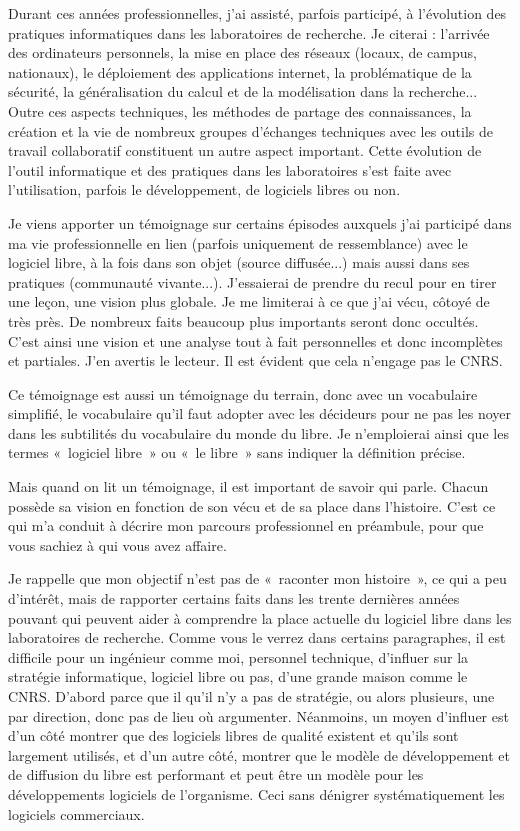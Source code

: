 \documentclass{FramateX}
\begin{document}
\begin{refsection}
Durant ces années professionnelles, j'ai assisté, parfois participé, à
l'évolution des pratiques informatiques dans les laboratoires de
recherche. Je citerai : l'arrivée des ordinateurs personnels, la mise
en place des réseaux (locaux, de campus, nationaux), le déploiement des
applications internet, la problématique de la sécurité, la
généralisation du calcul et de la modélisation dans la recherche...
Outre ces aspects techniques, les méthodes de partage des
connaissances, la création et la vie de nombreux groupes d'échanges
techniques avec les outils de travail collaboratif constituent un autre
aspect important. Cette évolution de l'outil informatique et des
pratiques dans les laboratoires s'est faite avec l'utilisation, parfois
le développement, de logiciels libres ou non.

Je viens apporter un témoignage sur certains épisodes auxquels j'ai
participé dans ma vie professionnelle en lien (parfois uniquement de
ressemblance) avec le logiciel libre, à la fois dans son objet (source
diffusée...) mais aussi dans ses pratiques (communauté vivante...).
J'essaierai de prendre du recul pour en tirer une leçon, une vision
plus globale. Je me limiterai à ce que j'ai vécu, côtoyé de très près.
De nombreux faits beaucoup plus importants seront donc occultés. C'est
ainsi une vision et une analyse tout à fait personnelles et donc
incomplètes et partiales. J'en avertis le lecteur. Il est évident que
cela n'engage pas le CNRS.

Ce témoignage est aussi un témoignage du terrain, donc avec un
vocabulaire simplifié, le vocabulaire qu'il faut adopter avec les
décideurs pour ne pas les noyer dans les subtilités du vocabulaire du
monde du libre. Je n'emploierai ainsi que les termes «~logiciel libre~»
ou «~le libre~» sans indiquer la définition précise.

Mais quand on lit un témoignage, il est important de savoir qui parle.
Chacun possède sa vision en fonction de son vécu et de sa place dans
l'histoire. C'est ce qui m'a conduit à décrire mon parcours
professionnel en préambule, pour que vous sachiez à qui vous avez
affaire.

Je rappelle que mon objectif n'est pas de «~raconter mon histoire~», ce
qui a peu d'intérêt, mais de rapporter certains faits dans les trente
dernières années pouvant qui peuvent aider à comprendre la place
actuelle du logiciel libre dans les laboratoires de recherche. Comme
vous le verrez dans certains paragraphes, il est difficile pour un
ingénieur comme moi, personnel technique, d'influer sur la stratégie
informatique, logiciel libre ou pas, d'une grande maison comme le CNRS.
D'abord parce que il qu'il n'y a pas de stratégie, ou alors plusieurs,
une par direction, donc pas de lieu où argumenter. Néanmoins, un moyen
d'influer est d'un côté montrer que des logiciels libres de qualité
existent et qu'ils sont largement utilisés, et d'un autre côté, montrer
que le modèle de développement et de diffusion du libre est performant
et peut être un modèle pour les développements logiciels de
l'organisme. Ceci sans dénigrer systématiquement les logiciels
commerciaux.


\end{refsection}
\end{document}
